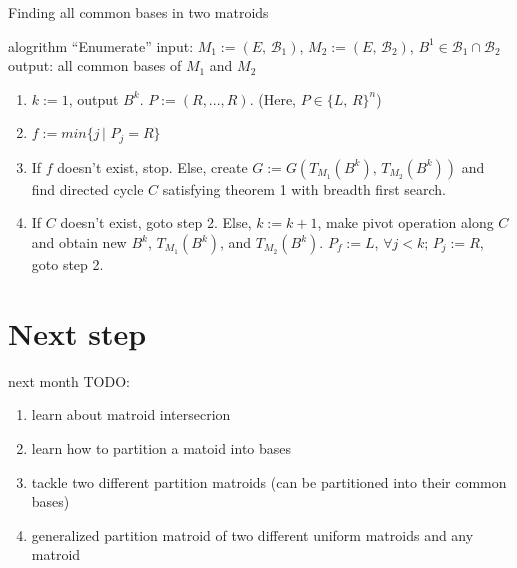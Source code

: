\documentclass[11pt,xcolor=dvipsnames,table,dvipdfmx]{beamer}
\begin{document}
\begin{frame}{Finding all common bases in two matroids}
 \begin{block}{alogrithm ``Enumerate''}
  input: $M_1 := (E,\,\mathcal{B}_1)$, $M_2 := (E,\,\mathcal{B}_2)$, $B^1 \in \mathcal{B}_1 \cap \mathcal{B}_2$\\
  output: all common bases of $M_1$ and $M_2$\\
  \begin{enumerate}
   \item $k := 1$, output $B^k$. $P := (R, ..., R)$. (Here, $P \in \{L,\,R\}^n$)
   \item $f := min\{j\,|\,\,P_j = R\}$
   \item If $f$ doesn't exist, stop. Else, create $G := G(T_{M_1}(B^k),\,T_{M_2}(B^k))$ and find directed cycle $C$ satisfying theorem 1 with breadth first search.
   \item If $C$ doesn't exist, goto step 2. Else, $k := k + 1$, make pivot operation along $C$ and obtain new $B^k$, $T_{M_1}(B^k)$, and $T_{M_2}(B^k)$. $P_f := L$, $\forall j < k;\,P_j := R$, goto step 2.
  \end{enumerate}
 \end{block}
\end{frame}


\section{Next step}
\begin{frame}{next month}
 TODO:
 \begin{enumerate}
  \item learn about matroid intersecrion
  \item learn how to partition a matoid into bases
  \item tackle two different partition matroids (can be partitioned into their common bases)
  \item generalized partition matroid of two different uniform matroids and any matroid
 \end{enumerate}
\end{frame}
\end{document}

